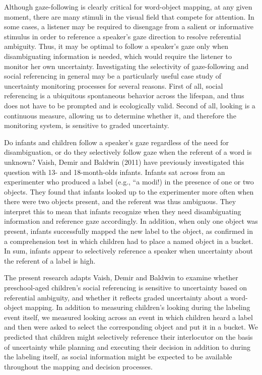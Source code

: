 \documentclass[10pt, letterpaper]{article}
\begin{document}
Although gaze-following is clearly critical for word-object mapping, at
any given moment, there are many stimuli in the visual field that
compete for attention. In some cases, a listener may be required to
disengage from a salient or informative stimulus in order to reference a
speaker's gaze direction to resolve referential ambiguity. Thus, it may
be optimal to follow a speaker's gaze only when disambiguating
information is needed, which would require the listener to monitor her
own uncertainty. Investigating the selectivity of gaze-following and
social referencing in general may be a particularly useful case study of
uncertainty monitoring processes for several reasons. First of all,
social referencing is a ubiquitous spontaneous behavior across the
lifespan, and thus does not have to be prompted and is ecologically
valid. Second of all, looking is a continuous measure, allowing us to
determine whether it, and therefore the monitoring system, is sensitive
to graded uncertainty.

Do infants and children follow a speaker's gaze regardless of the need
for disambiguation, or do they selectively follow gaze when the referent
of a word is unknown? Vaish, Demir and Baldwin (2011) have previously
investigated this question with 13- and 18-month-olds infants. Infants
sat across from an experimenter who produced a label (e.g., ``a modi!)
in the presence of one or two objects. They found that infants looked up
to the experimenter more often when there were two objects present, and
the referent was thus ambiguous. They interpret this to mean that
infants recognize when they need disambiguating information and
reference gaze accordingly. In addition, when only one object was
present, infants successfully mapped the new label to the object, as
confirmed in a comprehension test in which children had to place a named
object in a bucket. In sum, infants appear to selectively reference a
speaker when uncertainty about the referent of a label is high.

The present research adapts Vaish, Demir and Baldwin to examine whether
preschool-aged children's social referencing is sensitive to uncertainty
based on referential ambiguity, and whether it reflects graded
uncertainty about a word-object mapping. In addition to measuring
children's looking during the labeling event itself, we measured looking
across an event in which children heard a label and then were asked to
select the corresponding object and put it in a bucket. We predicted
that children might selectively reference their interlocutor on the
basis of uncertainty while planning and executing their decision in
addition to during the labeling itself, as social information might be
expected to be available throughout the mapping and decision processes.
\end{document}
